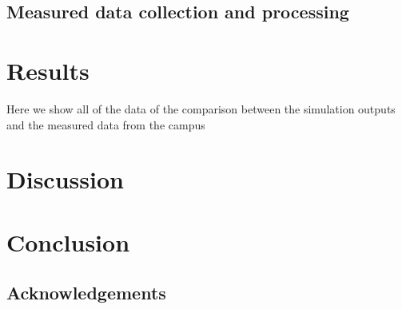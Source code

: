 \documentclass{tBPS2e}
\theoremstyle{plain}
\theoremstyle{definition}
\theoremstyle{remark}
\begin{document}
\subsection{Measured data collection and processing}




\section{Results}
{\color{red}Here we show all of the data of the comparison between the simulation outputs and the measured data from the campus}

\section{Discussion}


\section{Conclusion}

\subsection{Acknowledgements}





\end{document}
